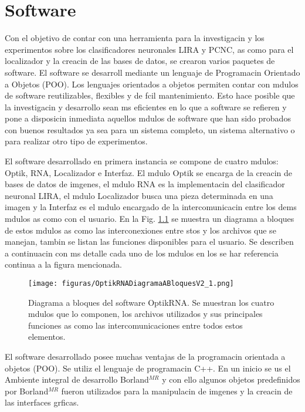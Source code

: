 \chapter{Software}
Con el objetivo de contar con una herramienta para la investigacin y
los experimentos sobre los clasificadores neuronales LIRA y PCNC, as como para el localizador y la creacin de las bases de datos, se crearon varios paquetes de software. El software se desarroll mediante un lenguaje de Programacin Orientado a Objetos (POO). Los lenguajes orientados a
objetos permiten contar con mdulos de software reutilizables,
flexibles y de fcil mantenimiento. Esto
hace posible que la investigacin y desarrollo sean ms eficientes en lo que a software se refieren
y pone a disposicin inmediata aquellos mdulos de software que han
sido probados con buenos resultados ya sea para un sistema completo,
un sistema alternativo o para realizar otro tipo de experimentos.

El software desarrollado en primera instancia se compone de cuatro mdulos: Optik, RNA,
Localizador e Interfaz. El mdulo Optik se encarga de la creacin de
bases de datos de imgenes, el mdulo RNA es la implementacin del
clasificador neuronal LIRA, el mdulo Localizador busca una pieza
determinada en una imagen y la Interfaz es el mdulo encargado de la
intercomunicacin entre los dems mdulos as como con el usuario. En
la Fig. \ref{OptikRNADiagramaABloques} se muestra un diagrama a bloques de estos mdulos as como
las interconexiones entre stos y los archivos que se manejan, tambin
se listan las funciones disponibles para el usuario. Se describen a
continuacin con ms detalle cada uno de los mdulos en los se har
referencia continua a la figura mencionada.

\begin{figure}[h]
\begin{center}
\texttt{[image: figuras/OptikRNADiagramaABloquesV2\_1.png]}
\caption[Diagrama a bloques del software OptikRNA.]{Diagrama a bloques del software OptikRNA. Se muestran los cuatro mdulos que lo componen, los archivos utilizados y sus
   principales funciones as como las intercomunicaciones entre todos
   estos elementos.}\label{OptikRNADiagramaABloques}
\end{center}
\end{figure}

El software desarrollado posee muchas ventajas de la programacin orientada a objetos (POO). Se utiliz el lenguaje de programacin C++. En un inicio se us el Ambiente integral de desarrollo Borland$^{MR}$ y con ello algunos objetos predefinidos por Borland$^{MR}$ fueron utilizados para la manipulacin de imgenes y la creacin de las interfaces grficas.

